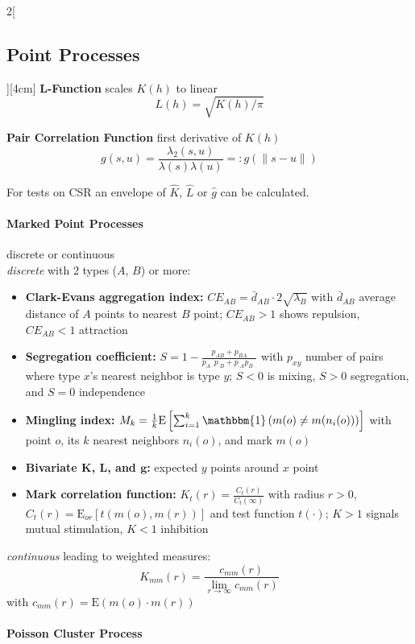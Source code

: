 \documentclass[8pt]{extarticle}
\begin{document}
\begin{multicols}{2}[\subsection{Point Processes}][4cm]
\vspace{0.3em}
\textbf{L-Function} scales $K(h)$ to linear
$$L(h)=\sqrt{K(h)/\pi}$$

\textbf{Pair Correlation Function}  first derivative of $K(h)$
$$g(s,u)=\frac{\lambda_2(s,u)}{\lambda(s)\lambda(u)} =: g(\|s-u\|)$$

\noindent For tests on CSR an envelope of $\hat{K}$, $\hat{L}$ or $\hat{g}$ can be calculated.

\paragraph{Marked Point Processes}  discrete or continuous \\
\vspace{0.3em}
\noindent\textit{discrete} with 2 types ($A$, $B$) or more:
\vspace{-0.7em}
\begin{itemize}[itemsep=-0.3em]
\item \textbf{Clark-Evans aggregation index:} $CE_{AB}=\bar{d}_{AB} \cdot 2\sqrt{\lambda_B}$ with $\bar{d}_{AB}$ average distance of $A$ points to nearest $B$ point; $CE_{AB}>1$ shows repulsion, $CE_{AB}<1$ attraction 
\item \textbf{Segregation coefficient:} $S=1{-}\frac{p_{AB}+p_{BA}}{p_{A\cdot}p_{\cdot B} + p_{\cdot A}p_{B \cdot}}$ with $p_{xy}$ number of pairs where type $x$'s nearest neighbor is type $y$; $S<0$ is mixing, $S>0$ segregation, and $S=0$ independence
\item \textbf{Mingling index:} $M_k = \frac{1}{k}\mathrm{E}\left[\sum_{i=1}^k\mathbbm{1}\left(m(o)\neq m(n_i(o))\right)\right]$ with point $o$, its $k$ nearest neighbors $n_i(o)$, and mark $m(o)$
\item \textbf{Bivariate $\boldsymbol{K}$, $\boldsymbol{L}$, and $\boldsymbol{g}$:} expected $y$ points around $x$ point
\item \textbf{Mark correlation function:} $K_t(r)=\frac{C_t(r)}{C_t(\infty)}$ with radius $r>0$,  $C_t(r)=\mathrm{E}_{or}\left[t(m(o),m(r))\right]$ and test function $t(\cdot)$; $K>1$ signals mutual stimulation, $K<1$ inhibition
\end{itemize}
\noindent\textit{continuous} leading to weighted measures:
$$K_{mm}(r)=\frac{c_{mm}(r)}{\lim_{r\rightarrow \infty} c_{mm}(r)}$$
with $c_{mm}(r)=\mathrm{E}(m(o)\cdot m(r))$

\paragraph{Poisson Cluster Process}


\end{multicols}
\end{document}
